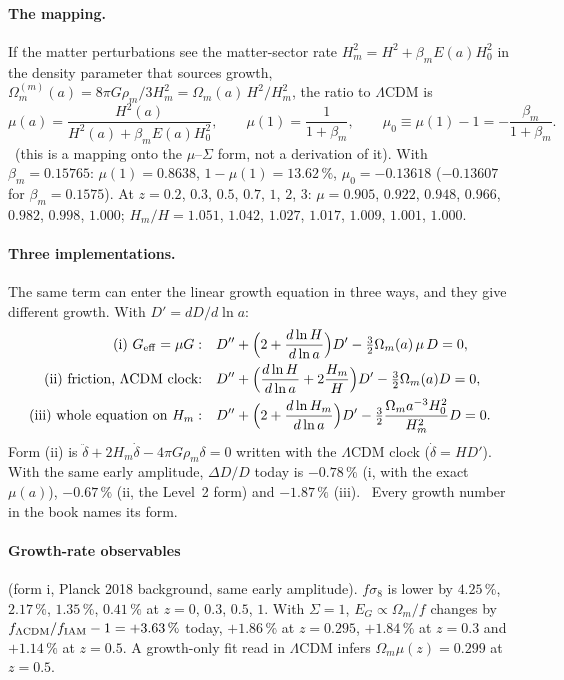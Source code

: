 \paragraph{The mapping.} If the matter perturbations see the matter-sector rate $H_m^2=H^2+\beta_mE(a)H_0^2$ in the density parameter that sources
growth, $\Omega_m^{(m)}(a)=8\pi G\rho_m/3H_m^2=\Omega_m(a)\,H^2/H_m^2$, the ratio to $\Lambda$CDM is
\begin{equation}
\mu(a)=\frac{H^2(a)}{H^2(a)+\beta_mE(a)H_0^2},\qquad \mu(1)=\frac1{1+\beta_m},\qquad\mu_0\equiv\mu(1)-1=-\frac{\beta_m}{1+\beta_m}.
\end{equation}
\interp\ (this is a mapping onto the $\mu$--$\Sigma$ form, not a derivation of it). With $\beta_m=0.15765$: $\mu(1)=0.8638$, $1-\mu(1)=13.62\,\%$,
$\mu_0=-0.13618$ ($-0.13607$ for $\beta_m=0.1575$). At $z=0.2$, $0.3$, $0.5$, $0.7$, $1$, $2$, $3$: $\mu=0.905$, $0.922$, $0.948$, $0.966$, $0.982$,
$0.998$, $1.000$; $H_m/H=1.051$, $1.042$, $1.027$, $1.017$, $1.009$, $1.001$, $1.000$. \calc

\paragraph{Three implementations.} The same term can enter the linear growth equation in three ways, and they give different growth. With
$D'=dD/d\ln a$:
\begin{align}
\text{(i) }G_{\rm eff}=\mu G:&\quad D''+\Big(2+\frac{d\ln H}{d\ln a}\Big)D'-\tfrac32\Omega_m(a)\,\mu\,D=0,\\
\text{(ii) friction, }\Lambda\text{CDM clock:}&\quad D''+\Big(\frac{d\ln H}{d\ln a}+2\frac{H_m}{H}\Big)D'-\tfrac32\Omega_m(a)D=0,\\
\text{(iii) whole equation on }H_m:&\quad D''+\Big(2+\frac{d\ln H_m}{d\ln a}\Big)D'-\tfrac32\frac{\Omega_ma^{-3}H_0^2}{H_m^2}D=0 .
\end{align}
Form (ii) is $\ddot\delta+2H_m\dot\delta-4\pi G\rho_m\delta=0$ written with the $\Lambda$CDM clock ($\dot\delta=HD'$). With the same early amplitude,
$\Delta D/D$ today is $-0.78\,\%$ (i, with the exact $\mu(a)$), $-0.67\,\%$ (ii, the Level~2 form) and $-1.87\,\%$ (iii). \calc\ Every growth number in
the book names its form.

\paragraph{Growth-rate observables} (form i, Planck 2018 background, same early amplitude). $f\sigma_8$ is lower by $4.25\,\%$, $2.17\,\%$, $1.35\,\%$,
$0.41\,\%$ at $z=0$, $0.3$, $0.5$, $1$. With $\Sigma=1$, $E_G\propto\Omega_m/f$ changes by $f_{\Lambda\rm CDM}/f_{\rm IAM}-1=+3.63\,\%$ today, $+1.86\,\%$ at
$z=0.295$, $+1.84\,\%$ at $z=0.3$ and $+1.14\,\%$ at $z=0.5$. A growth-only fit read in $\Lambda$CDM infers $\Omega_m\mu(z)=0.299$ at $z=0.5$. \calc

